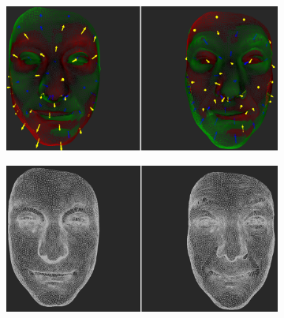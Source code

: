 \begin{figure}[h]
\centering
\begin{subfigure}{0.4\textwidth}
\includegraphics[width=\textwidth]{./screenshots/pair21.PNG}
\caption{}
\label{fig:study-9-21}
\end{subfigure}
\quad
\begin{subfigure}{0.4\textwidth}
\includegraphics[width=\textwidth]{./screenshots/pair19.PNG}
\caption{}
\label{fig:study-9-19}
\end{subfigure}


\end{figure}
